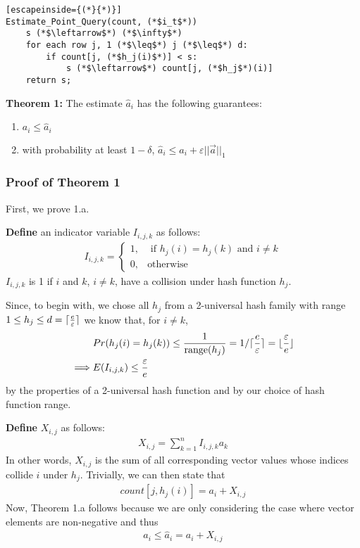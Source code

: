 \documentclass[11pt]{article}
\DeclarePairedDelimiter\ceil{\lceil}{\rceil}
\DeclarePairedDelimiter\floor{\lfloor}{\rfloor}
\begin{document}
\begin{lstlisting}[escapeinside={(*}{*)}]
Estimate_Point_Query(count, (*$i_t$*)) 
    s (*$\leftarrow$*) (*$\infty$*)
    for each row j, 1 (*$\leq$*) j (*$\leq$*) d:
        if count[j, (*$h_j(i)$*)] < s:
            s (*$\leftarrow$*) count[j, (*$h_j$*)(i)]
    return s;
\end{lstlisting}

\textbf{Theorem 1:} The estimate $\hat a_i$ has the following guarantees:
\begin{enumerate}[label=\textnormal{(\arabic*)}]
    \item $a_i \leq \hat{a}_i$
    \item with probability at least $1 - \delta$, $\hat{a}_i \leq a_i + \varepsilon ||\vec{a}||_1$
\end{enumerate}
\subsubsection{Proof of Theorem 1}
First, we prove 1.a.  

\textbf{Define} an indicator variable $I_{i, j, k}$ as follows:
\begin{align}
    I_{i, j, k} = 
    \begin{cases}
        1, & \text{ if } h_j(i) = h_j(k) \text{ and } i \neq k \\
        0, & \text{otherwise}
    \end{cases}
\end{align}
$I_{i, j, k}$ is 1 if $i$ and $k$, $i \neq k$, have a collision under hash function $h_j$.

Since, to begin with, we chose all $h_j$ from a 2-universal hash family
with range $1 \leq h_j \leq d = \ceil{\frac{e}{\varepsilon}}$ 
we know that, for $i \neq k$,
\begin{align}\label{eq:collision-prob}
    &Pr(h_j(i) = h_j(k)) \leq \frac{1}{\text{range}(h_j)} = 1/\ceil{\frac{e}{\varepsilon}} = \floor{\frac{\varepsilon}{e}} \nonumber\\
    \implies &E(I_{i, j, k}) \leq \frac{\varepsilon}{e}
\end{align}
by the properties of a 2-universal hash function and by our choice of hash function
range.

\textbf{Define} $X_{i, j}$ as follows:
\begin{align}
    X_{i, j} = \sum_{k = 1}^{n}I_{i, j, k} a_k
\end{align}
In other words, $X_{i, j}$ is the sum of all corresponding vector values whose indices
collide $i$ under $h_j$. Trivially, we can then state that
\begin{align}\label{eq:count-def}
    count[j, h_j(i)] = a_i + X_{i, j} 
\end{align}
Now, Theorem 1.a follows because we are only considering the case where vector
elements are non-negative and thus
\begin{align}
    a_i \leq \hat a_i = a_i + X_{i, j}
\end{align}
\end{document}
